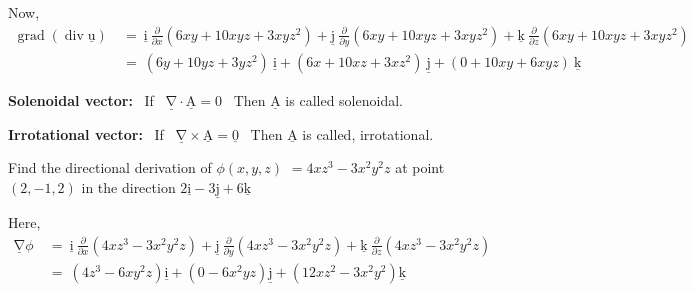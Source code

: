 \documentclass[12pt]{article}
\renewcommand{\vec}[1]{\underline{\mathrm{#1}}}
\begin{document}
\vspace{2ex}
Now, \\
$\begin{aligned}
\operatorname{grad}(\operatorname{div} \vec{u}) \ &= \
\vec{i} \ \frac{\partial}{\partial x}\left(6xy+10xyz+3xyz^2\right)+
\vec{j} \ \frac{\partial}{\partial y}\left(6xy+10xyz+3xyz^2\right)+
\vec{k} \ \frac{\partial}{\partial z}\left(6xy+10xyz+3xyz^2\right)\\
\ &= \ \left(6y+10yz+3yz^2\right) \ \vec{i} +
\left(6x+10xz+3xz^2\right) \ \vec{j} +
\left(0+10xy+6xyz\right) \ \vec{k}
\end{aligned}$


\pagebreak
\begin{tcolorbox}
\begin{center}
   \textbf{Solenoidal vector:} \ If \ $\vec{\nabla} \cdot \vec{A}=0$ \ Then $\vec{A}$ is called solenoidal.
   
   \vspace{1ex}
   \textbf{Irrotational vector:} \ If \ $\vec{\nabla} \times \vec{A}=\vec{0}$ \ Then $\vec{A}$ is called, irrotational.
\end{center}
\end{tcolorbox}





\textbf{} Find the directional derivation of $\phi(x, y, z)$ $=4xz^3-3x^2y^2z$ at point $(2,-1,2)$ in the direction $2 \vec{i}-3 \vec{j}+6 \vec{k}$



\vspace{3ex}
Here,\\
$\begin{aligned}
\vec{\nabla} \phi \ &= \
\vec{i} \ \frac{\partial}{\partial x}\left(4xz^3-3x^2y^2z\right) +
\vec{j} \ \frac{\partial}{\partial y}\left(4xz^3-3x^2y^2z\right) +
\vec{k} \ \frac{\partial}{\partial z}\left(4xz^3-3x^2y^2z\right) \\
\ &= \ \left(4 z^3-6 x y^2 z\right) \vec{i}+\left(0-6 x^2 y z\right) \vec{j}+\left(12 x z^2-3 x^2 y^2\right) \vec{k} \\
\end{aligned}$
\end{document}
